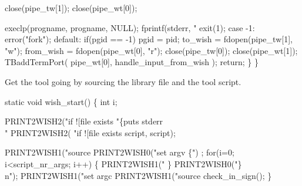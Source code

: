          close(pipe_tw[1]);
         close(pipe_wt[0]);
         
         execlp(progname, progname, NULL);
         fprintf(stderr, "%
         exit(1);
      case -1:
         error("fork");
      default:
         if(pgid == -1)
            pgid = pid;
         to_wish = fdopen(pipe_tw[1], "w");
         from_wish = fdopen(pipe_wt[0], "r");
         close(pipe_tw[0]);
         close(pipe_wt[1]);
         TBaddTermPort( pipe_wt[0], handle_input_from_wish );
         return;
   \}
\}
\nwendcode{}\nwdocspar


Get the tool going by sourcing the library file and the tool script.

\nwenddocs{}\endmoddef\let\nwnotused=\nwoutput{}\nwstartdeflinemarkup{}\nwenddeflinemarkup
static void wish_start()
\{
   int i;

   PRINT2WISH2("if ![file exists %
                      "\{puts stderr \\"%
   PRINT2WISH2(
        "if ![file exists %
                                                        script, script);
   
   PRINT2WISH1("source %
   PRINT2WISH0("set argv \{") ;
   for(i=0; i<script_nr_args; i++) \{
     PRINT2WISH1("%
   \}
   PRINT2WISH0("\}\\n");
   PRINT2WISH1("set argc %
   PRINT2WISH1("source %
   check_in_sign();
\}
\nwendcode{}\nwdocspar


